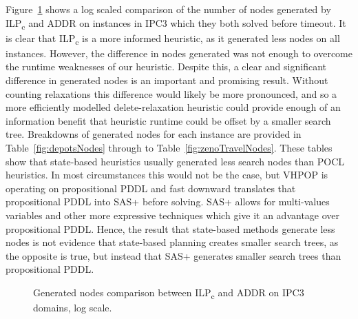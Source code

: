 Figure~\ref{fig:nodes} shows a log scaled comparison of the number of nodes generated by ILP\textsubscript{c} and ADDR on instances in IPC3 which they both solved before timeout. It is clear that ILP\textsubscript{c} is a more informed heuristic, as it generated less nodes on all instances. However, the difference in nodes generated was not enough to overcome the runtime weaknesses of our heuristic. Despite this, a clear and significant difference in generated nodes is an important and promising result. Without counting relaxations this difference would likely be more pronounced, and so a more efficiently modelled delete-relaxation heuristic could provide enough of an information benefit that heuristic runtime could be offset by a smaller search tree. Breakdowns of generated nodes for each instance are provided in Table~\ref{fig:depotsNodes} through to Table~\ref{fig:zenoTravelNodes}. These tables show that state-based heuristics usually generated less search nodes than POCL heuristics. In most circumstances this would not be the case, but VHPOP is operating on propositional PDDL and fast downward translates that propositional PDDL into SAS+ before solving. SAS+ allows for multi-values variables and other more expressive techniques which give it an advantage over propositional PDDL. Hence, the result that state-based methods generate less nodes is not evidence that state-based planning creates smaller search trees, as the opposite is true, but instead that SAS+ generates smaller search trees than propositional PDDL.


\begin{figure}[!hbt]
\centering
{}
\caption{Generated nodes comparison between ILP\textsubscript{c} and ADDR on IPC3 domains, log scale.}
\label{fig:nodes}
\end{figure}


